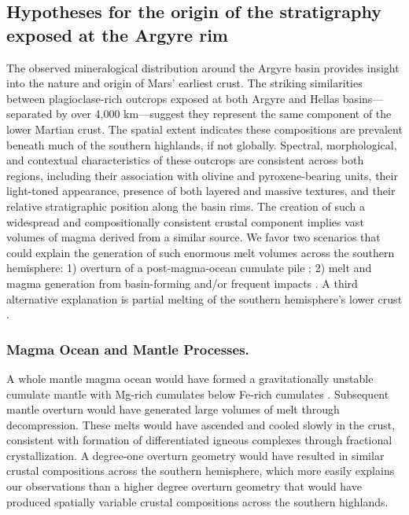 \documentclass[11pt]{article}
\begin{document}
\subsection*{Hypotheses for the origin of the stratigraphy exposed at the Argyre rim}

The observed mineralogical distribution around the Argyre basin provides insight into the nature and origin of Mars' earliest crust. The striking similarities between plagioclase-rich outcrops exposed at both Argyre and Hellas basins---separated by over 4,000 km---suggest they represent the same component of the lower Martian crust. The spatial extent indicates these compositions are prevalent beneath much of the southern highlands, if not globally. Spectral, morphological, and contextual characteristics of these outcrops are consistent across both regions, including their association with olivine and pyroxene-bearing units, their light-toned appearance, presence of both layered and massive textures, and their relative stratigraphic position along the basin rims. The creation of such a widespread and compositionally consistent crustal component implies vast volumes of magma derived from a similar source. We favor two scenarios that could explain the generation of such enormous melt volumes across the southern hemisphere: 1) overturn of a post-magma-ocean cumulate pile \citep{Borg2003, Elkins-Tanton2005}; 2) melt and magma generation from basin-forming and/or frequent impacts \citep{Koeppel2020, Manske2021, Black2024}. A third alternative explanation is partial melting of the southern hemisphere's lower crust \citep{BonnetGibet2025, Bernadet2025}.

\subsubsection*{Magma Ocean and Mantle Processes.} 

A whole mantle magma ocean would have formed a gravitationally unstable cumulate mantle with Mg-rich cumulates below Fe-rich cumulates \citep{Elkins-Tanton2005}. Subsequent mantle overturn would have generated large volumes of melt through decompression. These melts would have ascended and cooled slowly in the crust, consistent with formation of differentiated igneous complexes through fractional crystallization. A degree-one overturn geometry \citep{Borg2003, Elkins-Tanton2005, Debaille2008} would have resulted in similar crustal compositions across the southern hemisphere, which more easily explains our observations than a higher degree overturn geometry \citep{Scheinberg2014} that would have produced spatially variable crustal compositions across the southern highlands.
\end{document}
